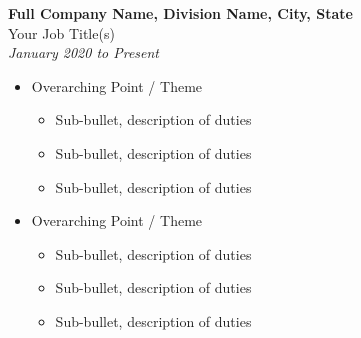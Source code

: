 \bigbreak
\noindent
\textbf{Full Company Name, Division Name, City, State}\\
Your Job Title(s)\\
\textit{January 2020 to Present}
\begin{itemize}[leftmargin=*]
    \item Overarching Point / Theme
    \begin{itemize}
        \item Sub-bullet, description of duties
        \item Sub-bullet, description of duties
        \item Sub-bullet, description of duties
    \end{itemize}

    \medskip
    \item Overarching Point / Theme
    \begin{itemize}
        \item Sub-bullet, description of duties
        \item Sub-bullet, description of duties
        \item Sub-bullet, description of duties
    \end{itemize}
\end{itemize}